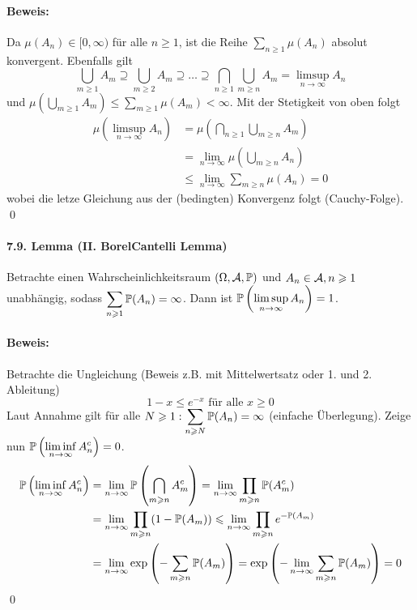 \documentclass[12pt]{report}
\begin{document}
\paragraph{Beweis:}Da $\mu(A_n)\in[0,\infty)$ f\"ur alle $n\geq1$, ist die Reihe $\displaystyle\sum_{n\geq1}\mu(A_n)$ absolut konvergent. Ebenfalls gilt 
$$\bigcup_{m\geq1}A_m\supseteq\bigcup_{m\geq2}A_m\supseteq\hdots\supseteq\bigcap_{n\geq1}\bigcup_{m\geq n}A_m=\limsup_{n\to\infty}A_n$$
und $\displaystyle\mu\left(\bigcup_{m\geq1}A_m\right)\leq\sum_{m\geq1}\mu(A_m)<\infty$. Mit der Stetigkeit von oben folgt
\begin{align*}
    \mu\left(\limsup_{n\to\infty}A_n\right)&=\mu\left(\bigcap_{n\geq1}\bigcup_{m\geq n}A_m\right)\\
    &=\lim_{n\to\infty}\mu\left(\bigcup_{m\geq n}A_n\right)\\
    &\leq\lim_{n\to\infty}\sum_{m\geq n}\mu(A_n)=0
\end{align*}
wobei die letze Gleichung aus der (bedingten) Konvergenz folgt (Cauchy-Folge). \qed

\paragraph{7.9. Lemma (II. Borel\textendash Cantelli Lemma)}Betrachte einen Wahrscheinlichkeitsraum $(\Omega, \mathcal{A}, \mathbb{P})$ und $A_n\in\mathcal{A},n\geqslant1$ unabh\"angig, sodass $\displaystyle\sum_{n\geqslant1}\mathbb{P}(A_n)=\infty$. Dann ist $\displaystyle\mathbb{P}\left(\limsup_{n\to\infty}A_n\right)=1$. 

\paragraph{Beweis:}Betrachte die Ungleichung (Beweis z.B. mit Mittelwertsatz oder 1. und 2. Ableitung)
$$1-x\leq e^{-x}\text{ f\"ur alle }x\geq0$$
Laut Annahme gilt f\"ur alle $N\geqslant1:\displaystyle\sum_{n\geqslant N}\mathbb{P}(A_n)=\infty$ (einfache \"Uberlegung). Zeige nun $\displaystyle\mathbb{P}\left(\liminf_{n\to\infty}A_n^c\right)=\nobreak0$.
\begin{align*}
    \mathbb{P}\left(\liminf_{n\to\infty}A_n^c\right)&=\lim_{n\to\infty}\mathbb{P}\left(\bigcap_{m\geqslant n}A_m^c\right)=\lim_{n\to\infty}\prod_{m\geqslant n}\mathbb{P}(A_m^c)\\
    &=\lim_{n\to\infty}\prod_{m\geqslant n}(1-\mathbb{P}(A_m))\leqslant\lim_{n\to\infty}\prod_{m\geqslant n}e^{-\mathbb{P}(A_m)}\\
    &=\lim_{n\to\infty}\exp\left(-\sum_{m\geqslant n}\mathbb{P}(A_m)\right)=\exp\left(-\lim_{n\to\infty}\sum_{m\geqslant n}\mathbb{P}(A_m)\right)=0
\end{align*}
\qed
\end{document}

